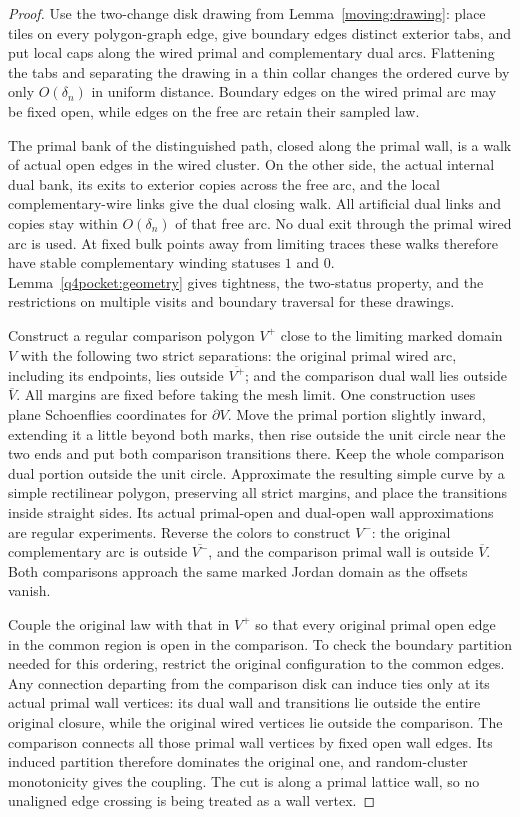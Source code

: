 \begin{proof}
Use the two-change disk drawing from
Lemma~\ref{moving:drawing}: place tiles on every polygon-graph
edge, give boundary edges distinct exterior tabs, and put
local caps along the wired primal and complementary dual
arcs.  Flattening the tabs and separating the drawing in
a thin collar changes the ordered curve by only
$O(\delta_n)$ in uniform distance.  Boundary edges on the
wired primal arc may be fixed open, while edges on the
free arc retain their sampled law.

The primal bank of the distinguished path, closed along
the primal wall, is a walk of actual open edges in the
wired cluster.  On the other side, the actual internal
dual bank, its exits to exterior copies across the free
arc, and the local complementary-wire links give the
dual closing walk.  All artificial dual links and copies
stay within $O(\delta_n)$ of that free arc.  No dual
exit through the primal wired arc is used.  At fixed
bulk points away from limiting traces these walks
therefore have stable complementary winding statuses
$1$ and $0$.  Lemma~\ref{q4pocket:geometry} gives tightness,
the two-status property, and the restrictions on multiple
visits and boundary traversal for these drawings.

Construct a regular comparison polygon $V^+$ close to the
limiting marked domain $V$ with the following two strict
separations: the original primal wired arc, including
its endpoints, lies outside $\overline{V^+}$; and the
comparison dual wall lies outside $\overline V$.
All margins are fixed before taking the mesh limit.
One construction uses plane Schoenflies coordinates for
$\partial V$.  Move the primal portion slightly inward,
extending it a little beyond both marks, then rise
outside the unit circle near the two ends and put
both comparison transitions there.  Keep the whole
comparison dual portion outside the unit circle.
Approximate the resulting simple curve by a simple
rectilinear polygon, preserving all strict margins,
and place the transitions inside straight sides.
Its actual primal-open and dual-open wall approximations
are regular experiments.  Reverse the colors to construct
$V^-$: the original complementary arc is outside
$\overline{V^-}$, and the comparison primal wall is
outside $\overline V$.  Both comparisons approach the
same marked Jordan domain as the offsets vanish.

Couple the original law with that in $V^+$ so that
every original primal open edge in the common region
is open in the comparison.  To check the boundary
partition needed for this ordering, restrict the
original configuration to the common edges.  Any
connection departing from the comparison disk can
induce ties only at its actual primal wall vertices:
its dual wall and transitions lie outside the entire
original closure, while the original wired vertices
lie outside the comparison.  The comparison connects
all those primal wall vertices by fixed open wall
edges.  Its induced partition therefore dominates
the original one, and random-cluster monotonicity
gives the coupling.  The cut is along a primal
lattice wall, so no unaligned edge crossing is
being treated as a wall vertex.


\end{proof}
